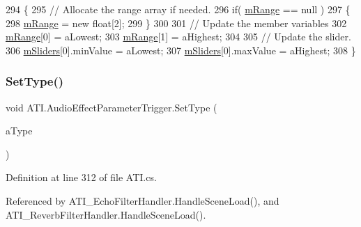 \begin{DoxyCode}
294         \{
295             \textcolor{comment}{// Allocate the range array if needed.}
296             \textcolor{keywordflow}{if}( \hyperlink{class_a_t_i_1_1_audio_effect_parameter_trigger_a5d507ef47c507ce355323ab8a072be7d}{mRange} == null )
297             \{
298                 \hyperlink{class_a_t_i_1_1_audio_effect_parameter_trigger_a5d507ef47c507ce355323ab8a072be7d}{mRange} = \textcolor{keyword}{new} \textcolor{keywordtype}{float}[2];
299             \}
300 
301             \textcolor{comment}{// Update the member variables}
302             \hyperlink{class_a_t_i_1_1_audio_effect_parameter_trigger_a5d507ef47c507ce355323ab8a072be7d}{mRange}[0] = aLowest;
303             \hyperlink{class_a_t_i_1_1_audio_effect_parameter_trigger_a5d507ef47c507ce355323ab8a072be7d}{mRange}[1] = aHighest;
304 
305             \textcolor{comment}{// Update the slider.}
306             \hyperlink{class_a_t_i_1_1_slider_handler_a038a487fbd701cb786e77c210830be76}{mSliders}[0].minValue = aLowest;
307             \hyperlink{class_a_t_i_1_1_slider_handler_a038a487fbd701cb786e77c210830be76}{mSliders}[0].maxValue = aHighest;
308         \}
\end{DoxyCode}
\mbox{\label{class_a_t_i_1_1_audio_effect_parameter_trigger_a12b9e1d13260a5970f5effed71b9a216}} 
\subsubsection{\texorpdfstring{Set\+Type()}{SetType()}}
{\footnotesize\ttfamily void A\+T\+I.\+Audio\+Effect\+Parameter\+Trigger.\+Set\+Type (\begin{DoxyParamCaption}\item[{\hyperlink{class_a_t_i_a1123d61b8dceb5867a3683e8d2224ee1}{Audio\+Effect\+Parameter\+Type}}]{a\+Type }\end{DoxyParamCaption})}



Definition at line 312 of file A\+T\+I.\+cs.



Referenced by A\+T\+I\+\_\+\+Echo\+Filter\+Handler.\+Handle\+Scene\+Load(), and A\+T\+I\+\_\+\+Reverb\+Filter\+Handler.\+Handle\+Scene\+Load().


